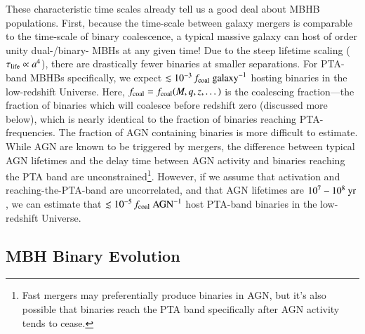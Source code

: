 \documentclass[onecolumn,authoryear]{els-mrw}
\begin{document}
These characteristic time scales already tell us a good deal about MBHB populations.  First, because the time-scale between galaxy mergers is comparable to the time-scale of binary coalescence, a typical massive galaxy can host of order unity dual-/binary- MBHs at any given time!  Due to the steep lifetime scaling ($\tau_{\textrm{life}} \propto a^4$), there are drastically fewer binaries at smaller separations.  For PTA-band MBHBs specifically, we expect $\lesssim 10^{-3} \, f_{\textrm{coal}}~\textrm{galaxy}^{-1}$ hosting binaries in the low-redshift Universe.  Here, $f_{\textrm{coal}} = f_{\textrm{coal}}(M,q,z,\dots)$ is the coalescing fraction---the fraction of binaries which will coalesce before redshift zero (discussed more below), which is nearly identical to the fraction of binaries reaching PTA-frequencies.  The fraction of AGN containing binaries is more difficult to estimate.  While AGN are known to be triggered by mergers, the difference between typical AGN lifetimes and the delay time between AGN activity and binaries reaching the PTA band are unconstrained\footnote{Fast mergers may preferentially produce binaries in AGN, but it's also possible that binaries reach the PTA band specifically after AGN activity tends to cease.}.  However, if we assume that activation and reaching-the-PTA-band are uncorrelated, and that AGN lifetimes are $10^7 - 10^8~\mathrm{yr}$ \citep[or $\fagn \sim 10^{-2}$, e.g.][and references therein]{Hopkins+2008}, we can estimate that $\lesssim 10^{-5} \, f_{\textrm{coal}}~\textrm{AGN}^{-1}$ host PTA-band binaries in the low-redshift Universe.


\subsection{MBH Binary Evolution}\label{sec:binary_evolution}

\end{document}
